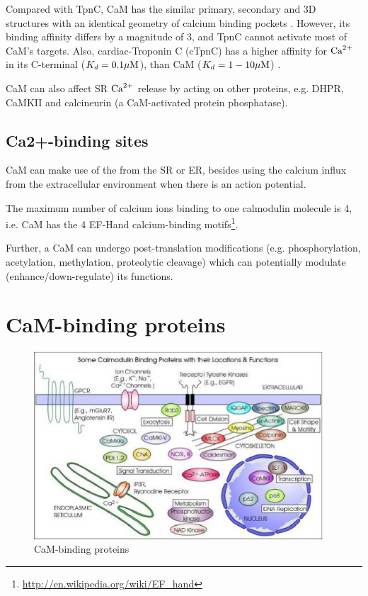 Compared with TpnC, CaM has the similar primary, secondary and 3D structures
with an identical geometry of calcium binding pockets \citep{yang2002}. However,
its binding affinity differs by a magnitude of 3, and TpnC cannot activate most
of CaM's targets. Also, cardiac-Troponin C (cTpnC) has a higher affinity for
${\text{Ca}^{2+}}$ in its C-terminal ($K_d=0.1{\mu\text{M}}$), than CaM ($K_d=1-10{\mu\text{M}}$)
\citep{george1993}.

CaM can also affect SR ${\text{Ca}^{2+}}$ release by acting on other proteins, e.g. DHPR,
CaMKII and calcineurin (a CaM-activated protein phosphatase).



\subsection{Ca2+-binding sites}

CaM can make use of the  from the SR or ER, besides using the calcium
influx from the extracellular environment when there is an action potential. 

The maximum number of calcium ions binding to one calmodulin molecule is 4, i.e.
CaM has the 4 EF-Hand calcium-binding
motifs\footnote{\url{http://en.wikipedia.org/wiki/EF_hand}}.

Further, a CaM can undergo post-translation modifications (e.g.
phosphorylation, acetylation, methylation, proteolytic cleavage) which can
potentially modulate (enhance/down-regulate) its functions.


\section{CaM-binding proteins}
\label{sec:cam-binding-proteins}


\begin{figure}[htb]
  \centerline{\includegraphics[height=7cm]{./images/CaM-binding-proteins.eps}}
  \caption{CaM-binding proteins}\label{fig:CaMBOT}
\end{figure}

